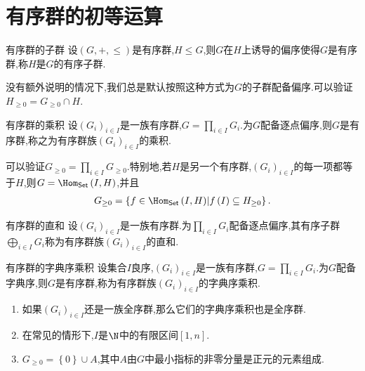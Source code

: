 \section{有序群的初等运算}

\begin{definition}{有序群的子群}{}
	设$\left(G,+,\leq\right)$是有序群,$H\leq G$,则$G$在$H$上诱导的偏序使得$G$是有序群,称$H$是$G$的有序子群.
\end{definition}

\begin{convention}{}{}
	没有额外说明的情况下,我们总是默认按照这种方式为$G$的子群配备偏序.可以验证$H_{\geq 0}=G_{\geq 0}\cap H$.
\end{convention}

\begin{definition}{有序群的乘积}{}
	设$\left(G_{i}\right)_{i\in I}$是一族有序群,$G=\prod\limits_{i\in I}G_{i}$.为$G$配备逐点偏序,则$G$是有序群,称之为有序群族$\left(G_{i}\right)_{i\in I}$的乘积.
\end{definition}

\begin{remark}{}{}
	可以验证$G_{\geq 0}=\prod\limits_{i\in I}G_{\geq 0}$.特别地,若$H$是另一个有序群,$\left(G_{i}\right)_{i\in I}$的每一项都等于$H$,则$G=\Hom_{\mathsf{Set}}\left(I,H\right)$,并且
	\begin{align*}
		G_{\geq 0}=\left\{f\in\Hom_{\mathsf{Set}}\left(I,H\right)\middle|f\left(I\right)\subseteq H_{\geq 0}\right\}.
	\end{align*}
\end{remark}

\begin{definition}{有序群的直和}{}
	设$\left(G_{i}\right)_{i\in I}$是一族有序群.为$\prod\limits_{i\in I}G_{i}$配备逐点偏序,其有序子群$\bigoplus\limits_{i\in I}G_{i}$称为有序群族$\left(G_{i}\right)_{i\in I}$的直和.
\end{definition}

\begin{definition}{有序群的字典序乘积}{}
	设集合$I$良序,$\left(G_{i}\right)_{i\in I}$是一族有序群,$G=\prod\limits_{i\in I}G_{i}$.为$G$配备字典序,则$G$是有序群,称为有序群族$\left(G_{i}\right)_{i\in I}$的字典序乘积.
\end{definition}

\begin{remark}{}{}
	\begin{enumerate}
		\item 如果$\left(G_{i}\right)_{i\in I}$还是一族全序群,那么它们的字典序乘积也是全序群.
		\item 在常见的情形下,$I$是$\N$中的有限区间$\left[1,n\right]$.
		\item $G_{\geq 0}=\left\{0\right\}\cup A$,其中$A$由$G$中最小指标的非零分量是正元的元素组成.
	\end{enumerate}
\end{remark}





















